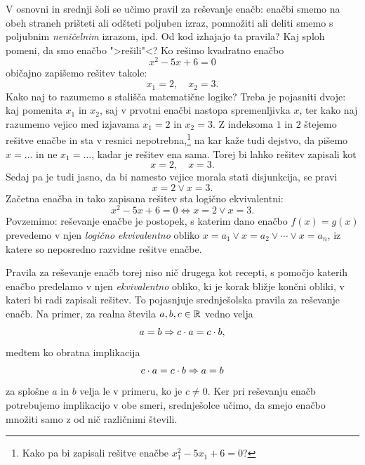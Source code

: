 V osnovni in srednji šoli se učimo pravil za reševanje enačb: enačbi
smemo na obeh straneh prišteti ali odšteti poljuben izraz, pomnožiti
ali deliti smemo s poljubnim \emph{neničelnim} izrazom, ipd. Od kod
izhajajo ta pravila? Kaj sploh pomeni, da smo enačbo ">rešili"<? Ko
rešimo kvadratno enačbo
%
\begin{equation*}
  x^2 - 5 x + 6 = 0
\end{equation*}
%
običajno zapišemo rešitev takole:
%
\begin{equation*}
  x_1 = 2, \quad x_2 = 3.
\end{equation*}
%
Kako naj to razumemo s stališča matematične logike? Treba je
pojasniti dvoje: kaj pomenita $x_1$ in $x_2$, saj v prvotni enačbi
nastopa spremenljivka $x$, ter kako naj razumemo vejico med izjavama
$x_1 = 2$ in $x_2 = 3$. Z indeksoma $1$ in $2$ štejemo rešitve enačbe
in sta v resnici nepotrebna,\footnote{Kako pa bi zapisali rešitve
  enačbe $x_1^2 - 5 x_1 + 6 = 0$?} na kar kaže tudi dejstvo, da
pišemo $x = \ldots$ in ne $x_1 = \ldots$, kadar je rešitev ena sama.
Torej bi lahko rešitev zapisali kot
%
\begin{equation*}
  x = 2, \quad x = 3.
\end{equation*}
%
Sedaj pa je tudi jasno, da bi namesto vejice morala stati disjunkcija,
se pravi
%
\begin{equation*}
  x = 2 \lor x = 3.
\end{equation*}
%
Začetna enačba in tako zapisana rešitev sta logično ekvivalentni:
%
\begin{equation*}
  x^2 - 5 x + 6 = 0 \iff
  x = 2 \lor x = 3.
\end{equation*}
%
Povzemimo: reševanje enačbe je postopek, s katerim dano enačbo $f(x) =
g(x)$ prevedemo v njen \emph{logično ekvivalentno} obliko $x = a_1
\lor x = a_2 \lor \cdots \lor x = a_n$, iz katere so neposredno razvidne
rešitve enačbe.

Pravila za reševanje enačb torej niso nič drugega kot recepti, s
pomočjo katerih enačbo predelamo v njen \emph{ekvivalentno} obliko, ki
je korak bližje končni obliki, v kateri bi radi zapisali rešitev. To
pojasnjuje srednješolska pravila za reševanje enačb. Na primer, za
realna števila $a, b, c \in \mathbb{R}$ vedno velja
%
\begin{equation*}
  a = b \Rightarrow c \cdot a = c \cdot b,
\end{equation*}
%
medtem ko obratna implikacija
%
\begin{equation*}
  c \cdot a = c \cdot b \Rightarrow a = b
\end{equation*}
%
za splošne $a$ in $b$ velja le v primeru, ko je $c \neq 0$. Ker pri
reševanju enačb potrebujemo implikacijo v obe smeri, srednješolce
učimo, da smejo enačbo množiti samo z od nič različnimi števili.


